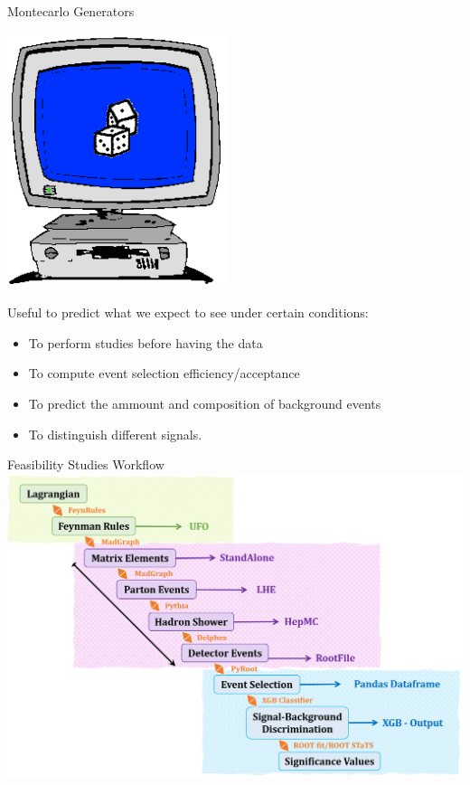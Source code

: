 \documentclass{../bredelebeamer}
\begin{document}
\begin{frame}{Montecarlo Generators}
	

	\begin{center}
		\includegraphics[scale=0.5]{A1}
	\end{center}

	Useful to predict what we expect to see under certain conditions:
	\begin{itemize}
		\item To perform studies before having the data
		\item To compute event selection efficiency/acceptance
		\item  To predict the ammount and composition of background events
		\item To distinguish different signals. 
	\end{itemize}
	
\end{frame}

\begin{frame}{Feasibility Studies Workflow}
	\includegraphics[width=1.0\linewidth]{Workflow.png}
\end{frame}
\end{document}
